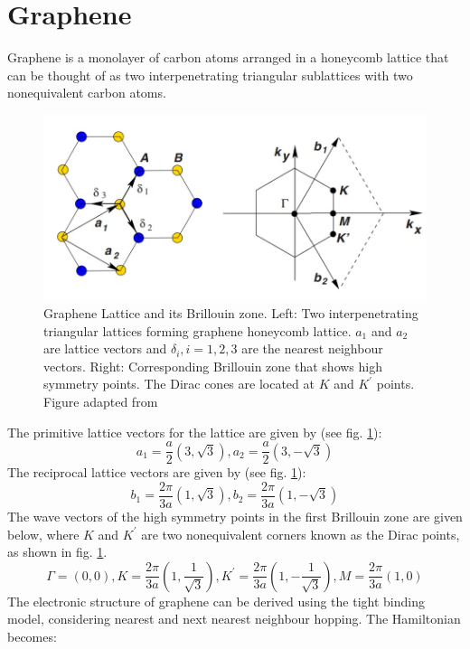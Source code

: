 \label{section:a}
\section{Graphene}
Graphene is a monolayer of carbon atoms arranged in a honeycomb lattice that can be thought of as two interpenetrating triangular sublattices with two nonequivalent carbon atoms.
\begin{figure}[H]
	\centering
	\includegraphics[width=\textwidth]{figures/lattice.jpg}
	\caption{Graphene Lattice and its Brillouin zone. Left: Two interpenetrating triangular lattices forming graphene honeycomb lattice. $a_1$ and $a_2$ are lattice vectors and $\delta_i, i=1,2,3$ are the nearest neighbour vectors. Right: Corresponding Brillouin zone that shows high symmetry points. The Dirac cones are located at $K$ and $K^\prime$ points. Figure adapted from \cite{Geim}}
	\label{fig:lattice}
\end{figure}
The primitive lattice vectors for the lattice are given by (see fig. \ref{fig:lattice}):
\begin{equation}
	a_1 = \frac{a}{2}(3,\sqrt{3}), a_2 = \frac{a}{2}(3,-\sqrt{3})
\end{equation}
The reciprocal lattice vectors are given by (see fig. \ref{fig:lattice}):
\begin{equation}
	b_1 = \frac{2\pi}{3a}(1,\sqrt{3}), b_2 = \frac{2\pi}{3a}(1,-\sqrt{3})
\end{equation}
The wave vectors of the high symmetry points in the first Brillouin zone are given below, where $K$ and $K^{\prime}$ are two nonequivalent corners known as the Dirac points, as shown in fig. \ref{fig:lattice}.
\begin{equation}
	\Gamma = (0,0),K=\frac{2\pi}{3a}(1,\frac{1}{\sqrt{3}}),K^{\prime}=\frac{2\pi}{3a}(1,-\frac{1}{\sqrt{3}}),M=\frac{2\pi}{3a}(1,0)
\end{equation}
The electronic structure of graphene can be derived using the tight binding model, considering nearest and next nearest neighbour hopping. The Hamiltonian becomes:
